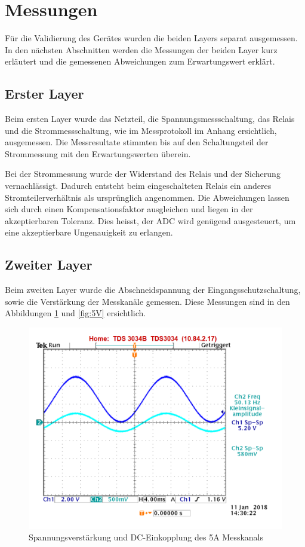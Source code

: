 \pagebreak
\section{Messungen}%
Für die Validierung des Gerätes wurden die beiden Layers separat ausgemessen. In den nächsten Abschnitten werden die Messungen der beiden Layer kurz erläutert und die gemessenen Abweichungen zum Erwartungswert erklärt.

\subsection*{Erster Layer}
Beim ersten Layer wurde das Netzteil, die Spannungsmessschaltung, das Relais und die Strommessschaltung, wie im Messprotokoll im Anhang ersichtlich, ausgemessen. Die Messresultate stimmten bis auf den Schaltungsteil der Strommessung mit den Erwartungswerten überein.

Bei der Strommessung wurde der Widerstand des Relais und der Sicherung vernachlässigt. Dadurch entsteht beim eingeschalteten Relais ein anderes Stromteilerverhältnis als ursprünglich angenommen. Die Abweichungen lassen sich durch einen Kompensationsfaktor ausgleichen und liegen in der akzeptierbaren Toleranz. Dies heisst, der ADC wird genügend ausgesteuert, um eine akzeptierbare Ungenauigkeit zu erlangen.

\subsection*{Zweiter Layer}
Beim zweiten Layer wurde die Abschneidspannung der Eingangsschutzschaltung, sowie die Verstärkung der Messkanäle gemessen. Diese Messungen sind in den Abbildungen \ref{fig:5A} und \ref{fig:5V} ersichtlich.

\begin{figure}[H]
\begin{center}
	\includegraphics[width=140mm]{images/qualitatssicherung_5A_500mVpp_50Hz.png}
	\caption{Spannungsverstärkung und DC-Einkopplung des 5A Messkanals} %
	\label{fig:5A}
\end{center}
\end{figure}

